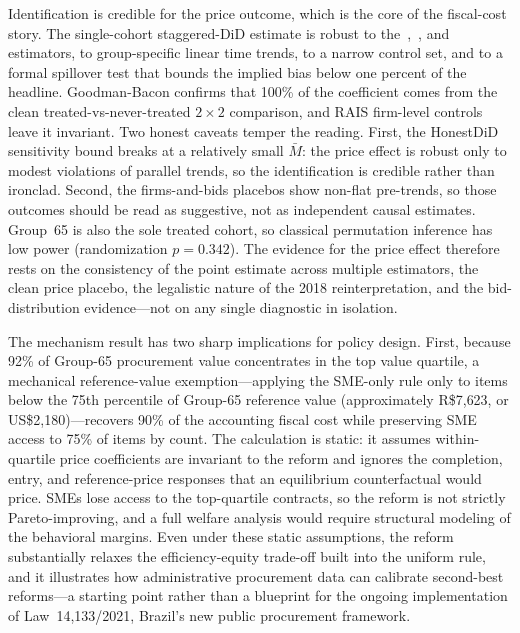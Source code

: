 Identification is credible for the price outcome, which is the core of the fiscal-cost story. The single-cohort staggered-DiD estimate is robust to the~\citet{callaway2021},~\citet{sun2021}, and~\citet{goodmanbacon2021} estimators, to group-specific linear time trends, to a narrow control set, and to a formal spillover test that bounds the implied bias below one percent of the headline. Goodman-Bacon confirms that 100\% of the coefficient comes from the clean treated-vs-never-treated $2\times2$ comparison, and RAIS firm-level controls leave it invariant. Two honest caveats temper the reading. First, the HonestDiD sensitivity bound breaks at a relatively small $\bar M$: the price effect is robust only to modest violations of parallel trends, so the identification is credible rather than ironclad. Second, the firms-and-bids placebos show non-flat pre-trends, so those outcomes should be read as suggestive, not as independent causal estimates. Group~65 is also the sole treated cohort, so classical permutation inference has low power (randomization $p=0.342$). The evidence for the price effect therefore rests on the consistency of the point estimate across multiple estimators, the clean price placebo, the legalistic nature of the 2018 reinterpretation, and the bid-distribution evidence---not on any single diagnostic in isolation.

The mechanism result has two sharp implications for policy design. First, because 92\% of Group-65 procurement value concentrates in the top value quartile, a mechanical reference-value exemption---applying the SME-only rule only to items below the 75th percentile of Group-65 reference value (approximately R\$7{,}623, or US\$2{,}180)---recovers 90\% of the accounting fiscal cost while preserving SME access to 75\% of items by count. The calculation is static: it assumes within-quartile price coefficients are invariant to the reform and ignores the completion, entry, and reference-price responses that an equilibrium counterfactual would price. SMEs lose access to the top-quartile contracts, so the reform is not strictly Pareto-improving, and a full welfare analysis would require structural modeling of the behavioral margins. Even under these static assumptions, the reform substantially relaxes the efficiency-equity trade-off built into the uniform rule, and it illustrates how administrative procurement data can calibrate second-best reforms---a starting point rather than a blueprint for the ongoing implementation of Law~14{,}133/2021, Brazil's new public procurement framework.

